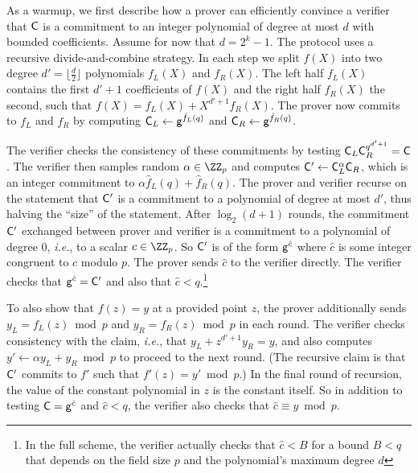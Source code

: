 As a warmup, we first describe how a prover can efficiently convince a verifier that $\mathsf{C}$ is a commitment to an integer polynomial of degree at most $d$ with bounded coefficients. Assume for now that $d=2^k-1$. The protocol uses a recursive divide-and-combine strategy. 
In each step we split $f(X)$ into two degree $d'=\lfloor\frac{d}{2}\rfloor$ polynomials $f_L(X)$ and $f_R(X)$. 
The left half $f_L(X)$ contains the first $d'+1$ coefficients of $f(X)$ and the right half $f_R(X)$ the second, such that $f(X)=f_L(X)+X^{d'+1}f_R(X)$. The prover now commits to $f_L$ and $f_R$ by computing $\mathsf{C}_L\gets \mathsf{g}^{\hat{f}_L(q)}$ and $\mathsf{C}_R\gets \mathsf{g}^{\hat{f}_R(q)}$.
\begin{comment}
In our running example, $f_L(X)=4X+1$ and $f_R(X)=2X+3$. 
\end{comment} 
The verifier checks the consistency of these commitments by testing $\mathsf{C}_L\mathsf{C}_R^{q^{d'+1}}=\mathsf{C}$. The verifier then samples random  $\alpha \in \ZZ_p$ and computes $\mathsf{C}'\gets \mathsf{C}_L^{\alpha}\mathsf{C}_R$, which is an integer commitment to $\alpha \hat{f}_L(q) + \hat{f}_R(q)$. The prover and verifier recurse on the statement that $\mathsf{C}'$ is a commitment to a polynomial of degree at most $d'$, thus halving the ``size'' of the statement. %
After $\log_2(d+1)$ rounds, the commitment $\mathsf{C}'$ exchanged between prover and verifier is a commitment to a polynomial of degree $0$, \emph{i.e.}, to a scalar $c \in \ZZ_p$. So $\mathsf{C}'$ is of the form $\mathsf{g}^{\hat{c}}$ where $\hat{c}$ is some integer congruent to $c$ modulo $p$. 
The prover sends $\hat{c}$ to the verifier directly. 
The verifier checks that $\mathsf{g}^{\hat{c}} = \mathsf{C}'$ and also that $\hat{c} < q$.\footnote{In the full scheme, the verifier actually checks that $\hat{c} < B$ for a bound $B < q$ that depends on the field size $p$ and the polynomial's maximum degree $d$} 

To also show that $f(z) = y$ at a provided point $z$, the prover additionally sends $y_L=f_L(z)\bmod p$ and $y_R=f_R(z)\bmod p$ in each round. The verifier checks consistency with the claim, \emph{i.e.}, that $y_L+z^{d'+1}y_R=y$, and also computes $y' \leftarrow \alpha y_L+y_R\bmod p$ to proceed to the next round. (The recursive claim is that $\mathsf{C}'$ commits to $f'$ such that $f'(z) = y' \bmod p$.) In the final round of recursion, the value of the constant polynomial in $z$ is the constant itself. So in addition to testing $\mathsf{C} = \mathsf{g}^{\hat{c}}$ and $\hat{c} < q$, the verifier also checks that $\hat{c} \equiv y \bmod p$.

